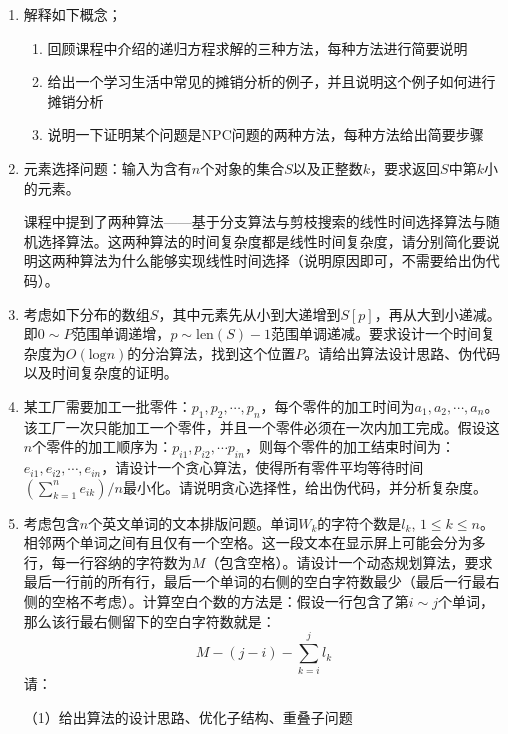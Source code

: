 \documentclass[UTF8,12pt,a4paper]{ctexart}
\begin{document}
\begin{enumerate}[label=\textbf{\arabic*.}, itemsep=\baselineskip]

    \item 解释如下概念；
    \begin{enumerate}
      \item 回顾课程中介绍的递归方程求解的三种方法，每种方法进行简要说明
      \item 给出一个学习生活中常见的摊销分析的例子，并且说明这个例子如何进行摊销分析
      \item 说明一下证明某个问题是NPC问题的两种方法，每种方法给出简要步骤
    \end{enumerate}

    \item 元素选择问题：输入为含有$n$个对象的集合$S$以及正整数$k$，要求返回$S$中第$k$小的元素。
    
    课程中提到了两种算法——基于分支算法与剪枝搜索的线性时间选择算法与随机选择算法。这两种算法的时间复杂度都是线性时间复杂度，请分别简化要说明这两种算法为什么能够实现线性时间选择（说明原因即可，不需要给出伪代码）。

    \item 考虑如下分布的数组$S$，其中元素先从小到大递增到$S[p]$，再从大到小递减。即$0 \sim P$范围单调递增，$p \sim \text{len}(S)-1$范围单调递减。要求设计一个时间复杂度为$O(\text{log}n)$的分治算法，找到这个位置$P$。请给出算法设计思路、伪代码以及时间复杂度的证明。

    \item 某工厂需要加工一批零件：$p_1, p_2, \cdots, p_n$，每个零件的加工时间为$a_1, a_2, \cdots, a_n$。该工厂一次只能加工一个零件，并且一个零件必须在一次内加工完成。假设这$n$个零件的加工顺序为：$p_{i1}, p_{i2}, \cdots p_{in}$，则每个零件的加工结束时间为：$e_{i1}, e_{i2}, \cdots, e_{in}$，请设计一个贪心算法，使得所有零件平均等待时间$(\sum_{k=1}^{n}{e_{ik}}) / n$最小化。请说明贪心选择性，给出伪代码，并分析复杂度。

	\item 考虑包含$n$个英文单词的文本排版问题。单词$W_k$的字符个数是$l_k$, $1 \leq k \leq n$。相邻两个单词之间有且仅有一个空格。这一段文本在显示屏上可能会分为多行，每一行容纳的字符数为$M$（包含空格）。请设计一个动态规划算法，要求最后一行前的所有行，最后一个单词的右侧的空白字符数最少（最后一行最右侧的空格不考虑）。计算空白个数的方法是：假设一行包含了第$i \sim j$个单词，那么该行最右侧留下的空白字符数就是：
	$$M - (j - i) - \sum_{k=i}^{j} l_k$$
	请：
	
	（1）给出算法的设计思路、优化子结构、重叠子问题 
	

\end{enumerate}
\end{document}
